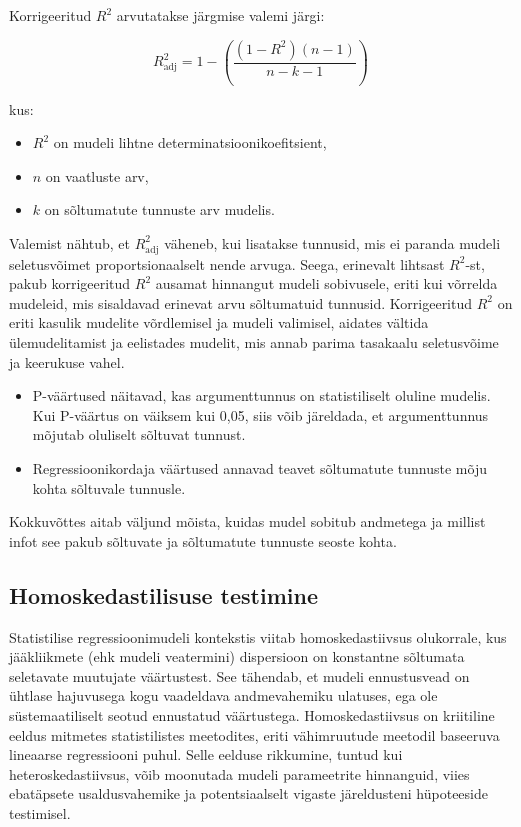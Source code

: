 \documentclass[
]{book}
\providecommand{\tightlist}{%
  \setlength{\itemsep}{0pt}\setlength{\parskip}{0pt}}
\begin{document}
Korrigeeritud \(R^2\) arvutatakse järgmise valemi järgi:

\[ R^2_{\text{adj}} = 1 - \left( \frac{(1 - R^2)(n - 1)}{n - k - 1} \right) \]

kus:

\begin{itemize}
\tightlist
\item
  \(R^2\) on mudeli lihtne determinatsioonikoefitsient,
\item
  \(n\) on vaatluste arv,
\item
  \(k\) on sõltumatute tunnuste arv mudelis.
\end{itemize}

Valemist nähtub, et \(R^2_{\text{adj}}\) väheneb, kui lisatakse tunnusid, mis ei paranda mudeli seletusvõimet proportsionaalselt nende arvuga. Seega, erinevalt lihtsast \(R^2\)-st, pakub korrigeeritud \(R^2\) ausamat hinnangut mudeli sobivusele, eriti kui võrrelda mudeleid, mis sisaldavad erinevat arvu sõltumatuid tunnusid. Korrigeeritud \(R^2\) on eriti kasulik mudelite võrdlemisel ja mudeli valimisel, aidates vältida ülemudelitamist ja eelistades mudelit, mis annab parima tasakaalu seletusvõime ja keerukuse vahel.

\begin{itemize}
\item
  P-väärtused näitavad, kas argumenttunnus on statistiliselt oluline mudelis. Kui P-väärtus on väiksem kui 0,05, siis võib järeldada, et argumenttunnus mõjutab oluliselt sõltuvat tunnust.
\item
  Regressioonikordaja väärtused annavad teavet sõltumatute tunnuste mõju kohta sõltuvale tunnusle.
\end{itemize}

Kokkuvõttes aitab väljund mõista, kuidas mudel sobitub andmetega ja millist infot see pakub sõltuvate ja sõltumatute tunnuste seoste kohta.

\subsection{Homoskedastilisuse testimine}\label{homoskedastilisuse-testimine}

Statistilise regressioonimudeli kontekstis viitab homoskedastiivsus olukorrale, kus jääkliikmete (ehk mudeli veatermini) dispersioon on konstantne sõltumata seletavate muutujate väärtustest. See tähendab, et mudeli ennustusvead on ühtlase hajuvusega kogu vaadeldava andmevahemiku ulatuses, ega ole süstemaatiliselt seotud ennustatud väärtustega. Homoskedastiivsus on kriitiline eeldus mitmetes statistilistes meetodites, eriti vähimruutude meetodil baseeruva lineaarse regressiooni puhul. Selle eelduse rikkumine, tuntud kui heteroskedastiivsus, võib moonutada mudeli parameetrite hinnanguid, viies ebatäpsete usaldusvahemike ja potentsiaalselt vigaste järeldusteni hüpoteeside testimisel.
\end{document}

